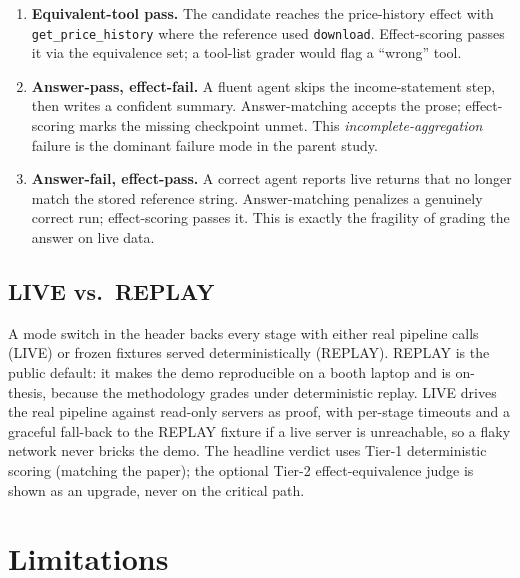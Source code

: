 \documentclass[11pt]{article}
\begin{document}
\begin{enumerate}\itemsep2pt
  \item \textbf{Equivalent-tool pass.} The candidate reaches the price-history
    effect with \texttt{get\_price\_history} where the reference used
    \texttt{download}. Effect-scoring passes it via the equivalence set; a
    tool-list grader would flag a ``wrong'' tool.
  \item \textbf{Answer-pass, effect-fail.} A fluent agent skips the
    income-statement step, then writes a confident summary. Answer-matching
    accepts the prose; effect-scoring marks the missing checkpoint
    \textsf{unmet}. This \emph{incomplete-aggregation} failure is the dominant
    failure mode in the parent study.
  \item \textbf{Answer-fail, effect-pass.} A correct agent reports live returns
    that no longer match the stored reference string. Answer-matching penalizes
    a genuinely correct run; effect-scoring passes it. This is exactly the
    fragility of grading the answer on live data.
\end{enumerate}

\subsection{LIVE vs.\ REPLAY}

A mode switch in the header backs every stage with either real pipeline calls
(LIVE) or frozen fixtures served deterministically (REPLAY). REPLAY is the
public default: it makes the demo reproducible on a booth laptop and is
on-thesis, because the methodology grades under deterministic replay. LIVE
drives the real pipeline against read-only servers as proof, with per-stage
timeouts and a graceful fall-back to the REPLAY fixture if a live server is
unreachable, so a flaky network never bricks the demo. The headline verdict uses
Tier-1 deterministic scoring (matching the paper); the optional Tier-2
effect-equivalence judge is shown as an upgrade, never on the critical path.




\section*{Limitations}
\label{sec:limitations}
\end{document}
